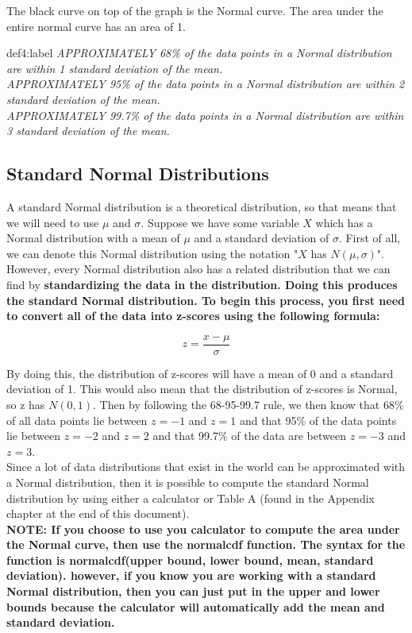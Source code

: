 The black curve on top of the graph is the Normal curve. The area under the entire normal curve has an area of 1.


\begin{definition}{def4:label}
    \it{APPROXIMATELY} 68\% of the data points in a Normal distribution are within 1 standard deviation of the mean.\\

    \it{APPROXIMATELY} 95\% of the data points in a Normal distribution are within 2 standard deviation of the mean.\\

    \it{APPROXIMATELY} 99.7\% of the data points in a Normal distribution are within 3 standard deviation of the mean.\\
\end{definition}


\subsection{Standard Normal Distributions}

A standard Normal distribution is a theoretical distribution, so that means that we will need to use $\mu$ and $\sigma$. Suppose we have some variable $X$ which has a Normal distribution with a mean of $\mu$ and a standard deviation of $\sigma$. First of all, we can denote this Normal distribution using the notation "$X$ has $N(\mu, \sigma)$". However, every Normal distribution also has a related distribution that we can find by \bf{standardizing} the data in the distribution. Doing this produces the \bf{standard Normal distribution}. To begin this process, you first need to convert all of the data into z-scores using the following formula:

$$
    z = \frac{x-\mu}{\sigma}
$$

By doing this, the distribution of z-scores will have a mean of 0 and a standard deviation of 1. This would also mean that the distribution of z-scores is Normal, so z has $N(0,1)$. Then by following the 68-95-99.7 rule, we then know that 68\% of all data points lie between $z=-1$ and $z=1$ and that 95\% of the data points lie between $z=-2$ and $z=2$ and that 99.7\% of the data are between $z=-3$ and $z=3$. \\

Since a lot of data distributions that exist in the world can be approximated with a Normal distribution, then it is possible to compute the standard Normal distribution by using either a calculator or Table A (found in the Appendix chapter at the end of this document).\\

\bf{NOTE:} If you choose to use you calculator to compute the area under the Normal curve, then use the normalcdf function. The syntax for the function is normalcdf(upper bound, lower bound, mean, standard deviation). however, if you know you are working with a standard Normal distribution, then you can just put in the upper and lower bounds because the calculator will automatically add the mean and standard deviation.